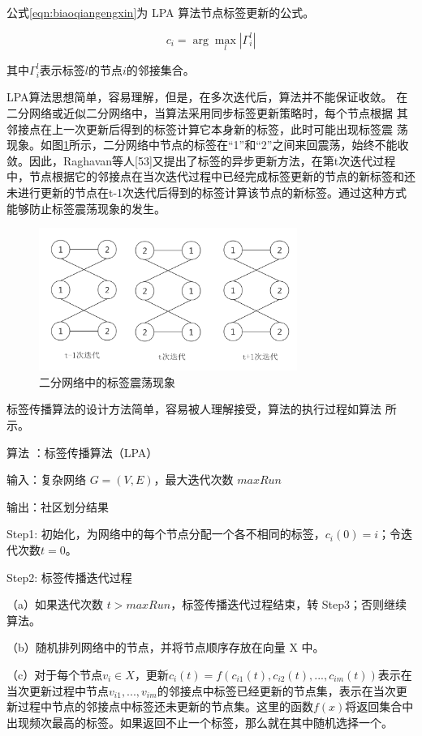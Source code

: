 公式\ref{eqn:biaoqiangengxin}为 LPA 算法节点标签更新的公式。

\begin{equation}
  \label{eqn:biaoqiangengxin}
  c_i=\arg\max_l \left | \Gamma _i^l \right |
\end{equation}

其中$\Gamma _i^l$表示标签$l$的节点$i$的邻接集合。

LPA算法思想简单，容易理解，但是，在多次迭代后，算法并不能保证收敛。
在二分网络或近似二分网络中，当算法采用同步标签更新策略时，每个节点根据
其邻接点在上一次更新后得到的标签计算它本身新的标签，此时可能出现标签震
荡现象。如图\ref{fig:fig3-1}所示，二分网络中节点的标签在“1”和“2”之间来回震荡，始终不能收敛。因此，Raghavan等人[53]又提出了标签的异步更新方法，在第t次迭代过程中，节点根据它的邻接点在当次迭代过程中已经完成标签更新的节点的新标签和还未进行更新的节点在t-1次迭代后得到的标签计算该节点的新标签。通过这种方式能够防止标签震荡现象的发生。

\begin{figure}
 \centering
 \includegraphics[width=0.75\textwidth]{figures/fig3-1}
 \caption{二分网络中的标签震荡现象}\label{fig:fig3-1}
\end{figure}

标签传播算法的设计方法简单，容易被人理解接受，算法的执行过程如算法
所示。

算法 ：标签传播算法（LPA） 

输入：复杂网络 $G = (V, E)$，最大迭代次数 $maxRun$ 

输出：社区划分结果 

Step1:  初始化，为网络中的每个节点分配一个各不相同的标签，$c_i(0)=i$；令迭代次数$t=0$。

Step2:  标签传播迭代过程 

（a）如果迭代次数 $t > maxRun$，标签传播迭代过程结束，转 Step3；否则继续算法。 

（b）随机排列网络中的节点，并将节点顺序存放在向量 X 中。 

（c）对于每个节点$v_i\in X$，更新$c_i(t)=f(c_{i1}(t), c_{i2}(t),..., c_{im}(t))$表示在当次更新过程中节点$v_{i1}, ..., v_{im}$的邻接点中标签已经更新的节点集，表示在当次更新过程中节点的邻接点中标签还未更新的节点集。这里的函数$f(x)$将返回集合中出现频次最高的标签。如果返回不止一个标签，那么就在其中随机选择一个。 

